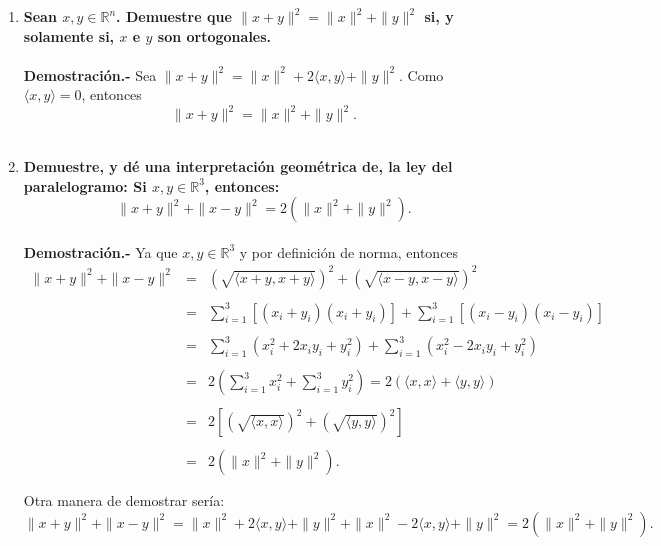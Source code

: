 \begin{enumerate}
    \item \textbf{\boldmath Sean $x,y\in \mathbb{R}^n$. Demuestre que $\|x+y\|^2=\|x\|^2+\|y\|^2$ si, y solamente si, $x$ e $y$ son ortogonales.\\\\
	Demostración.-}\; Sea $\|x+y\|^2=\|x\|^2+2\langle x,y\rangle + \|y\|^2$. Como $\langle x,y\rangle = 0$, entonces
	$$\|x+y\|^2=\|x\|^2 + \|y\|^2.$$\\


    \item \textbf{\boldmath Demuestre, y dé una interpretación geométrica de, la ley del paralelogramo: Si $x,y\in \mathbb{R}^3$, entonces:
	$$\|x+y\|^2 + \|x-y\|^2=2\left(\|x\|^2+\|y\|^2\right).$$\\
    Demostración.-}\; Ya que $x,y\in \mathbb{R}^3$ y por definición de norma, entonces
    $$\begin{array}{rcl}
	\|x+y\|^2 + \|x-y\|^2 &=& \left(\sqrt{\langle x+y,x+y\rangle}\right)^2+\left(\sqrt{\langle x-y,x-y\rangle}\right)^2\\\\
			      &=&\displaystyle\sum_{i=1}^3 \left[(x_i+y_i)(x_i+y_i)\right]+\sum_{i=1}^3 \left[(x_i-y_i)(x_i-y_i)\right]\\\\
			      &=&\displaystyle\sum_{i=1}^3\left(x_i^2+2x_iy_i+y_i^2\right)+\displaystyle\sum_{i=1}^3\left(x_i^2-2x_iy_i+y_i^2\right)\\\\
			      &=&\displaystyle 2\left(\sum_{i=1}^3x_i^2+\sum_{i=1}^3y_i^2\right) = 2\left(\langle x,x\rangle+\langle y,y\rangle\right)\\\\
			      &=& 2\left[\left(\sqrt{\langle x,x\rangle}\right)^2+\left(\sqrt{\langle y,y\rangle}\right)^2\right]\\\\
			      &=& 2\left(\|x\|^2+\|y\|^2\right).\\\\
    \end{array}$$
    Otra manera de demostrar sería:
    $$\|x+y\|^2 + \|x-y\|^2 = \|x\|^2 + 2\langle x,y\rangle + \|y\|^2 + \|x\|^2 - 2\langle x,y\rangle + \|y\|^2 = 2\left(\|x\|^2+\|y\|^2 \right).$$\\



\end{enumerate}
